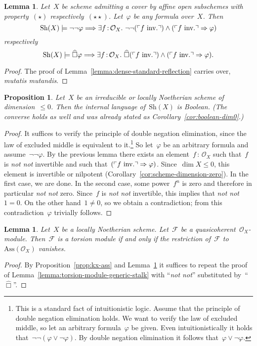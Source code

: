 \documentclass[10pt]{amsart}
\makeatletter
\theoremstyle{definition}
\theoremstyle{plain}
\newtheorem{prop}[defn]{Proposition}
\newtheorem{lemma}[defn]{Lemma}
\theoremstyle{remark}
\newcommand{\F}{\mathcal{F}}
\renewcommand{\O}{\mathcal{O}}
\newcommand{\Sh}{\mathrm{Sh}}
\newcommand{\Ass}{\mathrm{Ass}}
\newcommand{\?}{\,{:}\,}
\renewcommand{\_}{\mathpunct{.}\,}
\newcommand{\speak}[1]{\ulcorner\text{\textnormal{#1}}\urcorner}
\newcommand{\sdense}{{\widehat\Box}}
\newcommand{\inv}{inv.\@}
\newcommand{\notnot}{\emph{not not}\xspace}
\makeatother
\begin{document}
\begin{lemma}\label{lemma:dense-standard-reflection-generalized}
Let~$X$ be scheme admitting a cover by affine open subschemes
with property~$(\star)$ respectively~$(\star\star)$. Let~$\varphi$ be any formula
over~$X$. Then
\[ \Sh(X) \models \neg\neg\varphi \Longrightarrow \exists f\?\O_X\_
  \neg\neg(\speak{$f$ \inv}) \wedge (\speak{$f$ \inv} \Rightarrow \varphi) \]
respectively
\[ \Sh(X) \models \sdense\varphi \Longrightarrow \exists f\?\O_X\_
  \sdense(\speak{$f$ \inv}) \wedge (\speak{$f$ \inv} \Rightarrow \varphi). \]
\end{lemma}
\begin{proof}The proof of Lemma~\ref{lemma:dense-standard-reflection} carries
over, \emph{mutatis mutandis}.
\end{proof}

\begin{prop}\label{prop:boolean-dim0-continued}
Let~$X$ be an irreducible or locally Noetherian scheme of dimension~$\leq 0$. Then
the internal language of~$\Sh(X)$ is Boolean. (The converse holds as well and
was already stated as Corollary~\ref{cor:boolean-dim0}.)
\end{prop}
\begin{proof}
It suffices to verify the principle of double negation elimination, since the
law of excluded middle is equivalent to it.\footnote{This is a standard fact of
intuitionistic logic. Assume that the principle of double negation elimination
holds. We want to verify the law of excluded middle, so let an arbitrary
formula~$\varphi$ be given. Even intuitionistically it holds
that~$\neg\neg(\varphi \vee \neg\varphi)$. By double negation elimination it
follows that~$\varphi \vee \neg\varphi$.}
So let~$\varphi$ be an arbitrary formula and assume~$\neg\neg\varphi$. By the
previous lemma there exists an element~$f\?\O_X$ such that~$f$ is \notnot
invertible and such that~$(\speak{$f$ \inv} \Rightarrow \varphi)$. Since~$\dim
X \leq 0$, this element is invertible or nilpotent
(Corollary~\ref{cor:scheme-dimension-zero}).  In the first case, we are done.
In the second case, some power~$f^n$ is zero and therefore in particular
\notnot zero. Since~$f$ is \notnot invertible, this implies that \notnot~$1 =
0$. On the other hand~$1 \neq 0$, so we obtain a contradiction; from this
contradiction~$\varphi$ trivially follows.
\end{proof}

\begin{lemma}\label{lemma:torsion-module-generic-stalk-generalized}
Let~$X$ be a locally Noetherian scheme. Let~$\F$ be a
quasicoherent~$\O_X$-module. Then~$\F$ is a torsion module if and only if the
restriction of~$\F$ to~$\Ass(\O_X)$ vanishes.
\end{lemma}
\begin{proof}By Proposition~\ref{prop:kx-ass} and
Lemma~\ref{lemma:dense-standard-reflection-generalized} it suffices to repeat
the proof of Lemma~\ref{lemma:torsion-module-generic-stalk} with
``\notnot'' substituted by~``$\sdense$''.
\end{proof}
\end{document}
